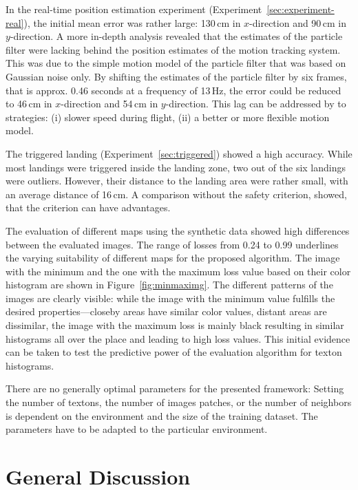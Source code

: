 \documentclass[11pt]{report}
\begin{document}
In the real-time position estimation experiment
(Experiment~\ref{sec:experiment-real}), the initial mean error
was rather large: 130\,cm in $x$-direction and 90\,cm in
$y$-direction. A more in-depth analysis revealed that the estimates of
the particle filter were lacking behind the position estimates of the
motion tracking system. This was due to the simple motion model of the
particle filter that was based on Gaussian noise only. By shifting the
estimates of the particle filter by six frames, that is approx. 0.46
seconds at a frequency of 13\,Hz, the error could be reduced to 46\,cm
in $x$-direction and 54\,cm in $y$-direction. This lag can be
addressed by to strategies: (i) slower speed during flight, (ii) a
better or more flexible motion model.

The triggered landing (Experiment~\ref{sec:triggered}) showed a high
accuracy. While most landings were triggered inside the landing zone,
two out of the six landings were outliers. However, their distance to
the landing area were rather small, with an average distance of
16\,cm. A comparison without the safety criterion, showed, that the
criterion can have advantages.

The evaluation of different maps using the synthetic data showed high
differences between the evaluated images. The range of losses from
0.24 to 0.99 underlines the varying suitability of different maps for
the proposed algorithm.
The
image with the minimum and the one with the maximum loss value based
on their color histogram are shown in Figure~\ref{fig:minmaximg}. The
different patterns of the images are clearly visible: while the image
with the minimum value fulfills the desired properties---closeby areas
have similar color values, distant areas are dissimilar, the image
with the maximum loss is mainly black resulting in similar histograms
all over the place and leading to high loss values. This initial
evidence can be taken to test the predictive power of the evaluation
algorithm for texton histograms.

There are no generally optimal parameters for the presented framework:
Setting the number of textons, the number of images patches, or the
number of neighbors is dependent on the environment and the size of
the training dataset. The parameters have to be adapted to the
particular environment.

\section{General Discussion}
\label{sec:generaldiscussion}
\end{document}
